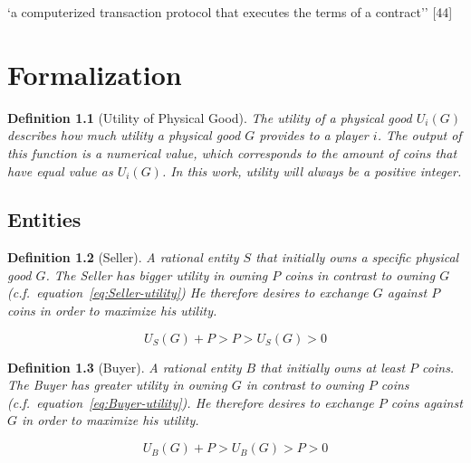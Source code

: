 \documentclass{cacthesis}
\newtheorem{definition}{Definition}
\begin{document}
‘a computerized transaction protocol that executes the terms of a contract’’ [44]\cite{chrisistidis}
\chapter{Formalization}
\label{cha:formalizations}

\begin{definition}[Utility of Physical Good]
\label{def:utility-function}
The utility of a physical good $U_i(G)$ describes how much utility a physical good $G$ provides to a player $i$. The output of this function is a numerical value, which corresponds to the amount of coins that have equal value as $U_i(G)$. In this work, utility will always be a positive integer.
\end{definition}

\section{Entities}

\begin{definition}[Seller]
\label{def:Seller}
A rational entity $S$ that initially owns a specific physical good $G$. The Seller
has bigger utility in owning $P$ coins in contrast to owning $G$ (c.f.~equation~\ref{eq:Seller-utility}) He therefore desires to exchange $G$ against $P$ coins in order to maximize his utility.
\end{definition}

\begin{equation}
\label{eq:Seller-utility}
    U_S(G) + P > P > U_S(G) > 0
\end{equation}

\begin{definition}[Buyer]
\label{def:Buyer}
A rational entity $B$ that initially owns at least $P$ coins. The Buyer has greater utility in owning $G$ in contrast to  owning $P$ coins (c.f.~equation~\ref{eq:Buyer-utility}). He therefore desires to exchange $P$ coins against $G$ in order to maximize his utility.
\end{definition}

\begin{equation}
\label{eq:Buyer-utility}
    U_B(G) + P > U_B(G) > P > 0
\end{equation}
\end{document}
